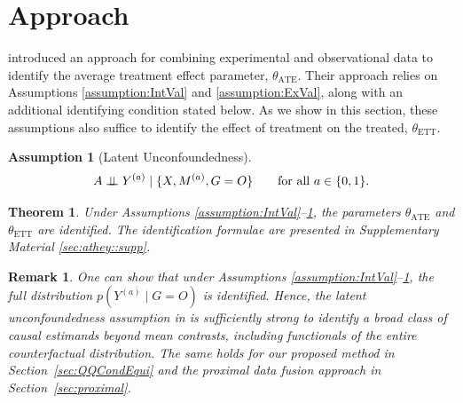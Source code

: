 \documentclass[10pt]{article}
\newtheorem{theorem}{Theorem}
\newtheorem{remark}{Remark}
\newtheorem{assumption}{Assumption}
\newcommand{\independent}{\perp\mkern-9.5mu\perp}
\begin{document}
\section{\cite{athey2020combining} Approach}
\label{sec:athey}

\cite{athey2020combining} introduced an approach for combining experimental and observational data to identify the average treatment effect parameter, $\theta_{\text{ATE}}$. Their approach relies on Assumptions \ref{assumption:IntVal} and \ref{assumption:ExVal}, along with an additional identifying condition stated below. As we show in this section, these assumptions also suffice to identify the effect of treatment on the treated, $\theta_{\text{ETT}}$.

\begin{assumption}[Latent Unconfoundedness]
\label{assumption:LaUn}
\[
A \independent Y^{(a)} \mid \{X, M^{(a)}, G = O\} \qquad \text{for all } a \in \{0,1\}.
\]	
\end{assumption}

\begin{theorem}
\label{thm:athey}
Under Assumptions \ref{assumption:IntVal}--\ref{assumption:LaUn}, the parameters $\theta_{\text{ATE}}$ and $\theta_{\text{ETT}}$ are identified. The identification formulae are presented in Supplementary Material \ref{sec:athey::supp}.
\end{theorem}
\begin{remark}
One can show that under Assumptions \ref{assumption:IntVal}--\ref{assumption:LaUn}, the full distribution \( p(Y^{(a)} \mid G = O) \) is identified. Hence, the latent unconfoundedness assumption in \citep{athey2020combining} is sufficiently strong to identify a broad class of causal estimands beyond mean contrasts, including functionals of the entire counterfactual distribution. The same holds for our proposed method in Section~\ref{sec:QQCondEqui} and the proximal data fusion approach in Section~\ref{sec:proximal}.
\end{remark}
\end{document}

